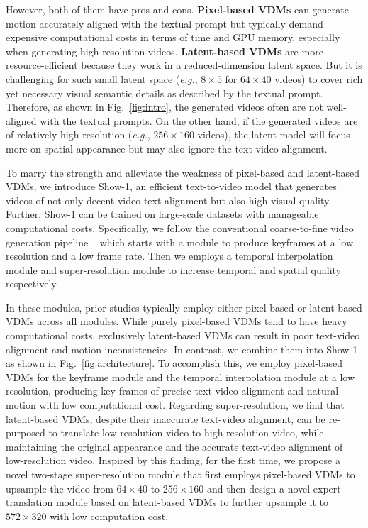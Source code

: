 \documentclass{article} \usepackage{iclr2024_conference,times}
\newcommand{\eg}{\textit{e.g.}}
\begin{document}
However, both of them have pros and cons. \textbf{Pixel-based VDMs} can generate motion accurately aligned with the textual prompt but typically demand expensive computational costs in terms of time and GPU memory, especially when generating high-resolution videos.
\textbf{Latent-based VDMs} are more resource-efficient because they work in a reduced-dimension latent space.
But it is challenging for such small latent space (\eg, $8 \times 5$ for $64 \times 40$ videos) to cover rich yet necessary visual semantic details as described by the textual prompt.
Therefore, as shown in Fig.~\ref{fig:intro}, the generated videos often are not well-aligned with the textual prompts. On the other hand, if the generated videos are of relatively high resolution (\eg, $256 \times 160$ videos), the latent model will focus more on spatial appearance but may also ignore the text-video alignment.









To marry the strength and alleviate the weakness of pixel-based and latent-based VDMs, we introduce Show-1, an efficient text-to-video model that generates videos of not only decent video-text alignment but also high visual quality. Further, Show-1 can be trained on large-scale datasets with manageable computational costs.
Specifically, we follow the conventional coarse-to-fine video generation pipeline ~\citep{ ho2022imagen, blattmann2023align} which starts with a  module to produce keyframes at a low resolution and a low frame rate. Then we employs a temporal interpolation module and super-resolution module to increase temporal and spatial quality respectively.

In these  modules, prior studies typically employ either pixel-based or latent-based VDMs across all modules. While purely pixel-based VDMs tend to have heavy computational costs, exclusively latent-based VDMs can result in poor text-video alignment and motion inconsistencies.
In contrast, we combine them into Show-1 as shown in Fig.~\ref{fig:architecture}. To accomplish this, we employ pixel-based VDMs for the keyframe module and the temporal interpolation module at a low resolution, producing key frames of precise text-video alignment and natural motion with low computational cost.
Regarding super-resolution, we find that latent-based VDMs, despite their inaccurate text-video alignment, can be re-purposed to translate low-resolution video to high-resolution video, while maintaining the original appearance and the accurate text-video alignment of low-resolution video.
Inspired by this finding, for the first time, we propose a novel two-stage super-resolution module that first employs pixel-based VDMs to upsample the video from $64 \times 40$ to $256 \times 160$ and then design a novel expert translation module based on latent-based VDMs to further upsample it to $572 \times 320$ with low computation cost.
\end{document}
